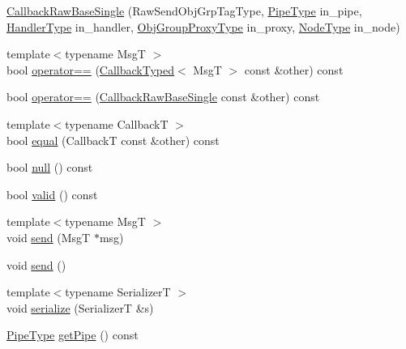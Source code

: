 \begin{DoxyCompactItemize}
\item 
\hyperlink{structvt_1_1pipe_1_1callback_1_1cbunion_1_1_callback_raw_base_single_a8db688e82d3fb4d8f7f0a37817a0d929}{Callback\+Raw\+Base\+Single} (Raw\+Send\+Obj\+Grp\+Tag\+Type, \hyperlink{namespacevt_ac9852acda74d1896f48f406cd72c7bd3}{Pipe\+Type} in\+\_\+pipe, \hyperlink{namespacevt_af64846b57dfcaf104da3ef6967917573}{Handler\+Type} in\+\_\+handler, \hyperlink{namespacevt_ad7cae989df485fccca57f0792a880a8e}{Obj\+Group\+Proxy\+Type} in\+\_\+proxy, \hyperlink{namespacevt_a866da9d0efc19c0a1ce79e9e492f47e2}{Node\+Type} in\+\_\+node)
\item 
{\footnotesize template$<$typename MsgT $>$ }\\bool \hyperlink{structvt_1_1pipe_1_1callback_1_1cbunion_1_1_callback_raw_base_single_a0ed7e09c29d285f662731495b0a61ad0}{operator==} (\hyperlink{structvt_1_1pipe_1_1callback_1_1cbunion_1_1_callback_typed}{Callback\+Typed}$<$ MsgT $>$ const \&other) const
\item 
bool \hyperlink{structvt_1_1pipe_1_1callback_1_1cbunion_1_1_callback_raw_base_single_a875b9abe53b942d1e432beec980359e0}{operator==} (\hyperlink{structvt_1_1pipe_1_1callback_1_1cbunion_1_1_callback_raw_base_single}{Callback\+Raw\+Base\+Single} const \&other) const
\item 
{\footnotesize template$<$typename CallbackT $>$ }\\bool \hyperlink{structvt_1_1pipe_1_1callback_1_1cbunion_1_1_callback_raw_base_single_a5a2b870d980afbeb12ff2b708028cddc}{equal} (CallbackT const \&other) const
\item 
bool \hyperlink{structvt_1_1pipe_1_1callback_1_1cbunion_1_1_callback_raw_base_single_a69279b16198da6a06c5cfb28203c9819}{null} () const
\item 
bool \hyperlink{structvt_1_1pipe_1_1callback_1_1cbunion_1_1_callback_raw_base_single_ae71a381a339f3e46adea8f93a6726bd5}{valid} () const
\item 
{\footnotesize template$<$typename MsgT $>$ }\\void \hyperlink{structvt_1_1pipe_1_1callback_1_1cbunion_1_1_callback_raw_base_single_a4b09f1ec8917085ba9934764c16b29d6}{send} (MsgT $\ast$msg)
\item 
void \hyperlink{structvt_1_1pipe_1_1callback_1_1cbunion_1_1_callback_raw_base_single_acfc41cee55923769ee3a9eca8b5d9031}{send} ()
\item 
{\footnotesize template$<$typename SerializerT $>$ }\\void \hyperlink{structvt_1_1pipe_1_1callback_1_1cbunion_1_1_callback_raw_base_single_afee30505e0bcec590b9675f93b44eadc}{serialize} (SerializerT \&s)
\item 
\hyperlink{namespacevt_ac9852acda74d1896f48f406cd72c7bd3}{Pipe\+Type} \hyperlink{structvt_1_1pipe_1_1callback_1_1cbunion_1_1_callback_raw_base_single_a3422df77d381724e530631720ec9720b}{get\+Pipe} () const
\end{DoxyCompactItemize}
